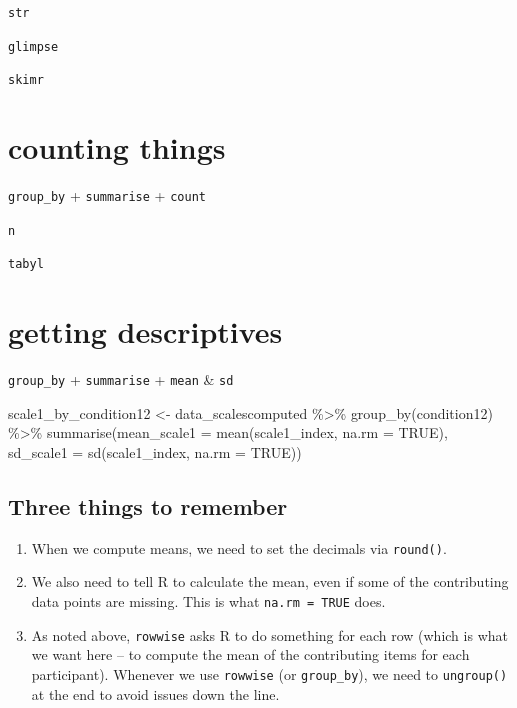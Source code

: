 \documentclass[
  letterpaper,
  DIV=11,
  numbers=noendperiod]{scrreprt}
\newenvironment{Shaded}{\begin{snugshade}}{\end{snugshade}}
\newcommand{\AttributeTok}[1]{\textcolor[rgb]{0.40,0.45,0.13}{#1}}
\newcommand{\ConstantTok}[1]{\textcolor[rgb]{0.56,0.35,0.01}{#1}}
\newcommand{\FunctionTok}[1]{\textcolor[rgb]{0.28,0.35,0.67}{#1}}
\newcommand{\NormalTok}[1]{\textcolor[rgb]{0.00,0.23,0.31}{#1}}
\newcommand{\OtherTok}[1]{\textcolor[rgb]{0.00,0.23,0.31}{#1}}
\newcommand{\SpecialCharTok}[1]{\textcolor[rgb]{0.37,0.37,0.37}{#1}}
\providecommand{\tightlist}{%
  \setlength{\itemsep}{0pt}\setlength{\parskip}{0pt}}\usepackage{longtable,booktabs,array}
\begin{document}
\texttt{str}

\texttt{glimpse}

\texttt{skimr}

\section{counting things}\label{counting-things}

\texttt{group\_by} + \texttt{summarise} + \texttt{count}

\texttt{n}

\texttt{tabyl}

\section{getting descriptives}\label{getting-descriptives}

\texttt{group\_by} + \texttt{summarise} + \texttt{mean} \& \texttt{sd}

\begin{Shaded}
\begin{Highlighting}[]
\NormalTok{scale1\_by\_condition12 }\OtherTok{\textless{}{-}}\NormalTok{ data\_scalescomputed }\SpecialCharTok{\%\textgreater{}\%}
  \FunctionTok{group\_by}\NormalTok{(condition12) }\SpecialCharTok{\%\textgreater{}\%}
  \FunctionTok{summarise}\NormalTok{(}\AttributeTok{mean\_scale1 =} \FunctionTok{mean}\NormalTok{(scale1\_index, }\AttributeTok{na.rm =} \ConstantTok{TRUE}\NormalTok{),}
            \AttributeTok{sd\_scale1 =} \FunctionTok{sd}\NormalTok{(scale1\_index, }\AttributeTok{na.rm =} \ConstantTok{TRUE}\NormalTok{))}
\end{Highlighting}
\end{Shaded}

\subsection{Three things to remember}\label{three-things-to-remember}

\begin{enumerate}
\def\labelenumi{\arabic{enumi}.}
\tightlist
\item
  When we compute means, we need to set the decimals via
  \texttt{round()}.
\item
  We also need to tell R to calculate the mean, even if some of the
  contributing data points are missing. This is what
  \texttt{na.rm\ =\ TRUE} does.
\item
  As noted above, \texttt{rowwise} asks R to do something for each row
  (which is what we want here -- to compute the mean of the contributing
  items for each participant). Whenever we use \texttt{rowwise} (or
  \texttt{group\_by}), we need to \texttt{ungroup()} at the end to avoid
  issues down the line.
\end{enumerate}
\end{document}
